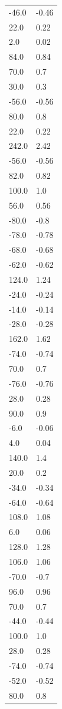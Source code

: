 \begin{longtable}{ll}
-46.0 & -0.46 \\
22.0 & 0.22 \\
2.0 & 0.02 \\
84.0 & 0.84 \\
70.0 & 0.7 \\
30.0 & 0.3 \\
-56.0 & -0.56 \\
80.0 & 0.8 \\
22.0 & 0.22 \\
242.0 & 2.42 \\
-56.0 & -0.56 \\
82.0 & 0.82 \\
100.0 & 1.0 \\
56.0 & 0.56 \\
-80.0 & -0.8 \\
-78.0 & -0.78 \\
-68.0 & -0.68 \\
-62.0 & -0.62 \\
124.0 & 1.24 \\
-24.0 & -0.24 \\
-14.0 & -0.14 \\
-28.0 & -0.28 \\
162.0 & 1.62 \\
-74.0 & -0.74 \\
70.0 & 0.7 \\
-76.0 & -0.76 \\
28.0 & 0.28 \\
90.0 & 0.9 \\
-6.0 & -0.06 \\
4.0 & 0.04 \\
140.0 & 1.4 \\
20.0 & 0.2 \\
-34.0 & -0.34 \\
-64.0 & -0.64 \\
108.0 & 1.08 \\
6.0 & 0.06 \\
128.0 & 1.28 \\
106.0 & 1.06 \\
-70.0 & -0.7 \\
96.0 & 0.96 \\
70.0 & 0.7 \\
-44.0 & -0.44 \\
100.0 & 1.0 \\
28.0 & 0.28 \\
-74.0 & -0.74 \\
-52.0 & -0.52 \\
80.0 & 0.8 \\

\end{longtable}

